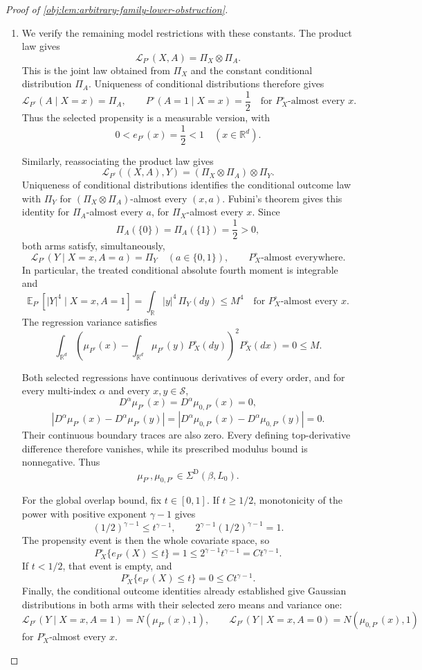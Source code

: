 \begin{proof}[Proof of \cref{obj:lem:arbitrary-family-lower-obstruction}]
\begin{enumerate}
\item We verify the remaining model restrictions with these constants. The product law gives
\[
\mathcal L_{P^\circ}(X,A)=\Pi_X\otimes\Pi_A.
\]
This is the joint law obtained from \(\Pi_X\) and the constant conditional distribution \(\Pi_A\). Uniqueness of conditional distributions therefore gives
\[
\mathcal L_{P^\circ}(A\mid X=x)=\Pi_A,
\qquad
P^\circ(A=1\mid X=x)=\frac12
\quad\text{for }P_X^\circ\text{-almost every }x.
\]
Thus the selected propensity is a measurable version, with
\[
0<e_{P^\circ}(x)=\frac12<1
\quad (x\in\mathbb R^d).
\]

Similarly, reassociating the product law gives
\[
\mathcal L_{P^\circ}((X,A),Y)
=(\Pi_X\otimes\Pi_A)\otimes\Pi_Y.
\]
Uniqueness of conditional distributions identifies the conditional outcome law with \(\Pi_Y\) for \((\Pi_X\otimes\Pi_A)\)-almost every \((x,a)\). Fubini's theorem gives this identity for \(\Pi_A\)-almost every \(a\), for \(\Pi_X\)-almost every \(x\). Since
\[
\Pi_A(\{0\})=\Pi_A(\{1\})=\frac12>0,
\]
both arms satisfy, simultaneously,
\[
\mathcal L_{P^\circ}(Y\mid X=x,A=a)=\Pi_Y
\quad(a\in\{0,1\}),
\qquad
P_X^\circ\text{-almost everywhere}.
\]
In particular, the treated conditional absolute fourth moment is integrable and
\[
\mathbb E_{P^\circ}\!\left[|Y|^4\mid X=x,A=1\right]
=
\int_{\mathbb R}|y|^4\,\Pi_Y(dy)
\le M^4
\quad\text{for }P_X^\circ\text{-almost every }x.
\]
The regression variance satisfies
\[
\int_{\mathbb R^d}
\left(
\mu_{P^\circ}(x)
-\int_{\mathbb R^d}\mu_{P^\circ}(y)\,P_X^\circ(dy)
\right)^2P_X^\circ(dx)
=0\le M.
\]

Both selected regressions have continuous derivatives of every order, and for every multi-index \(\alpha\) and every \(x,y\in\mathcal S\),
\[
D^\alpha\mu_{P^\circ}(x)
=D^\alpha\mu_{0,P^\circ}(x)=0,
\]
\[
|D^\alpha\mu_{P^\circ}(x)-D^\alpha\mu_{P^\circ}(y)|
=
|D^\alpha\mu_{0,P^\circ}(x)-D^\alpha\mu_{0,P^\circ}(y)|
=0.
\]
Their continuous boundary traces are also zero. Every defining top-derivative difference therefore vanishes, while its prescribed modulus bound is nonnegative. Thus
\[
\mu_{P^\circ},\mu_{0,P^\circ}\in\Sigma^{\mathrm D}(\beta,L_0).
\]

For the global overlap bound, fix \(t\in[0,1]\). If \(t\ge1/2\), monotonicity of the power with positive exponent \(\gamma-1\) gives
\[
(1/2)^{\gamma-1}\le t^{\gamma-1},
\qquad
2^{\gamma-1}(1/2)^{\gamma-1}=1.
\]
The propensity event is then the whole covariate space, so
\[
P_X^\circ\{e_{P^\circ}(X)\le t\}
=1
\le 2^{\gamma-1}t^{\gamma-1}
=Ct^{\gamma-1}.
\]
If \(t<1/2\), that event is empty, and
\[
P_X^\circ\{e_{P^\circ}(X)\le t\}
=0\le Ct^{\gamma-1}.
\]
Finally, the conditional outcome identities already established give Gaussian distributions in both arms with their selected zero means and variance one:
\[
\mathcal L_{P^\circ}(Y\mid X=x,A=1)
=N(\mu_{P^\circ}(x),1),
\qquad
\mathcal L_{P^\circ}(Y\mid X=x,A=0)
=N(\mu_{0,P^\circ}(x),1)
\]
for \(P_X^\circ\)-almost every \(x\). %


\end{enumerate}
\end{proof}
